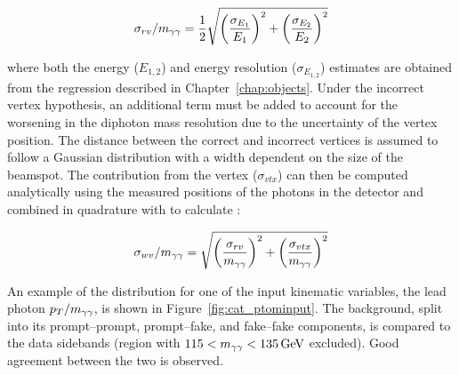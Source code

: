 \begin{equation}
  \sigma_{rv}/m_{\gamma\gamma} = \frac{1}{2} \sqrt{\left(\frac{\sigma_{E_1}}{E_1}\right)^{2}
                              + \left(\frac{\sigma_{E_2}}{E_2}\right)^{2}}
\end{equation}

where both the energy ($E_{1,2}$) and energy resolution ($\sigma_{E_{1,2}}$) estimates 
are obtained from the regression described in Chapter~\ref{chap:objects}.
Under the incorrect vertex hypothesis, an additional term must be added to account for the 
worsening in the diphoton mass resolution due to the uncertainty of the vertex position.
The distance between the correct and incorrect vertices is assumed to follow a Gaussian distribution
with a width dependent on the size of the beamspot.
The contribution from the vertex ($\sigma_{vtx}$) can then be computed analytically 
using the measured positions of the photons in the detector 
and combined in quadrature with \srv to calculate \swv:

\begin{equation}
  \sigma_{wv}/m_{\gamma\gamma} = \sqrt{\left(\frac{\sigma_{rv}}{m_{\gamma\gamma}}\right)^{2}
                              + \left(\frac{\sigma_{vtx}}{m_{\gamma\gamma}}\right)^{2}}
\end{equation}

An example of the distribution for one of the input kinematic variables, the lead photon $p_T/m_{\gamma\gamma}$, 
is shown in Figure~\ref{fig:cat_ptominput}.
The background, split into its prompt--prompt, prompt--fake, and fake--fake components, 
is compared to the data sidebands (region with $115 < m_{\gamma\gamma} < \SI{135}{GeV}$ excluded).
Good agreement between the two is observed.

